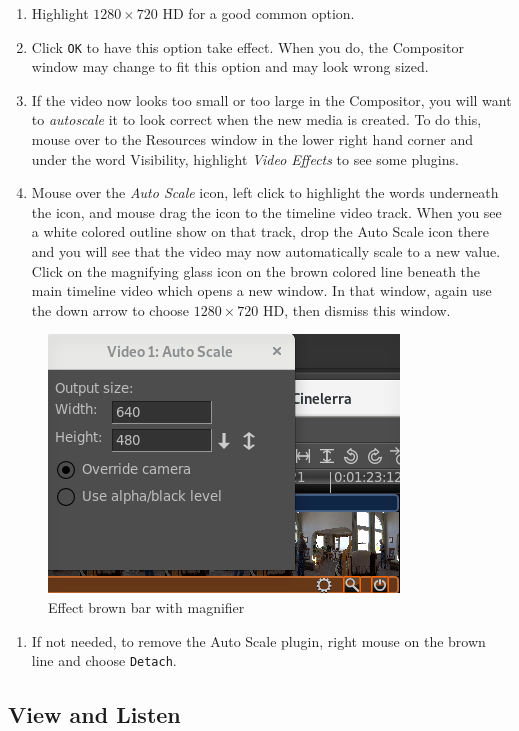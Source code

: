 \begin{enumerate}[resume]
	\item Highlight $1280\times720$ HD for a good common option.
	\item Click \texttt{OK} to have this option take effect.  When you do, the Compositor window may change to fit
	this option and may look wrong sized.
	\item If the video now looks too small or too large in the Compositor, you will want to \textit{autoscale} it to
	look correct when the new media is created.  To do this, mouse over to the Resources window in the
	lower right hand corner and under the word Visibility, highlight \textit{Video Effects} to see some
	plugins.
	\item Mouse over the \textit{Auto Scale} icon, left click to highlight the words underneath the icon, and mouse
	drag the icon to the timeline video track.  When you see a white colored outline show on that track,
	drop the Auto Scale icon there and you will see that the video may now automatically scale to a
	new value.  Click on the magnifying glass icon on the brown colored line beneath the main timeline
	video which opens a new window.  In that window, again use the down arrow to choose $1280\times720$
	HD, then dismiss this window.
\end{enumerate}

\begin{figure}[htpb]
	\centering
	\includegraphics[width=0.6\linewidth]{images/magnifier.png}
	\caption{Effect brown bar with magnifier}	
\end{figure}

\begin{enumerate}[resume]
	\item If not needed, to remove the Auto Scale plugin, right mouse on the brown line and choose \texttt{Detach}.
\end{enumerate}

\subsection{View and Listen}%
\label{sub:view_listen}

